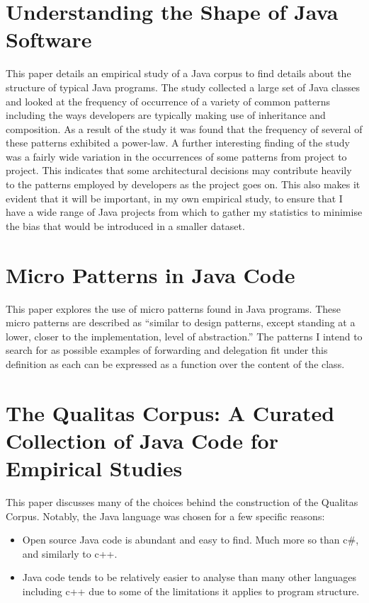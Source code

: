 \section{Understanding the Shape of Java Software~\cite{ShapeOfJava}}
This paper details an empirical study of a Java corpus to find details about the structure of typical Java programs. The study collected a large set of Java classes and looked at the frequency of occurrence of a variety of common patterns including the ways developers are typically making use of inheritance and composition. As a result of the study it was found that the frequency of several of these patterns exhibited a power-law. \newline
A further interesting finding of the study was a fairly wide variation in the occurrences of some patterns from project to project. This indicates that some architectural decisions may contribute heavily to the patterns employed by developers as the project goes on. This also makes it evident that it will be important, in my own empirical study, to ensure that I have a wide range of Java projects from which to gather my statistics to minimise the bias that would be introduced in a smaller dataset.

\section{Micro Patterns in Java Code~\cite{JavaMicropatterns}}
This paper explores the use of micro patterns found in Java programs. These micro patterns are described as “similar to design patterns, except standing at a lower, closer to the implementation, level of abstraction.”\newline
The patterns I intend to search for as possible examples of forwarding and delegation fit under this definition as each can be expressed as a function over the content of the class.

\section{The Qualitas Corpus: A Curated Collection of Java Code for Empirical Studies~\cite{QualitasCorpus}}
This paper discusses many of the choices behind the construction of the Qualitas Corpus. Notably, the Java language was chosen for a few specific reasons:
\begin{itemize}
	\item Open source Java code is abundant and easy to find. Much more so than c\#, and similarly to c++.
	\item Java code tends to be relatively easier to analyse than many other languages including c++ due to some of the limitations it applies to program structure.
\end{itemize}

